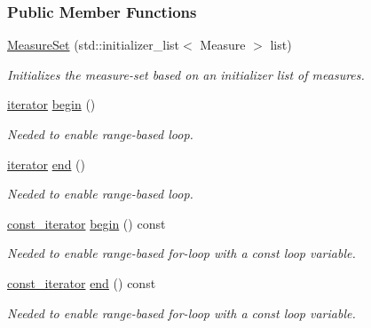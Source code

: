 \subsubsection*{Public Member Functions}
\begin{DoxyCompactItemize}
\item 
\hyperlink{structslb_1_1core_1_1sb_1_1MeasureSet_a0b03f75db584bf843a44fce20b9fd5aa}{Measure\+Set} (std\+::initializer\+\_\+list$<$ Measure $>$ list)\hypertarget{structslb_1_1core_1_1sb_1_1MeasureSet_a0b03f75db584bf843a44fce20b9fd5aa}{}\label{structslb_1_1core_1_1sb_1_1MeasureSet_a0b03f75db584bf843a44fce20b9fd5aa}

\begin{DoxyCompactList}\small\item\em Initializes the measure-\/set based on an initializer list of measures. \end{DoxyCompactList}\item 
\hyperlink{structslb_1_1core_1_1sb_1_1MeasureSet_a7e1ad3e450df31415c6282ae4ccc325f}{iterator} \hyperlink{structslb_1_1core_1_1sb_1_1MeasureSet_a2c3fc8ebeebaef3aaca79fae4df57faa}{begin} ()
\begin{DoxyCompactList}\small\item\em Needed to enable range-\/based loop. \end{DoxyCompactList}\item 
\hyperlink{structslb_1_1core_1_1sb_1_1MeasureSet_a7e1ad3e450df31415c6282ae4ccc325f}{iterator} \hyperlink{structslb_1_1core_1_1sb_1_1MeasureSet_afc9e9f8546f2ce2c2348239f593a55d3}{end} ()
\begin{DoxyCompactList}\small\item\em Needed to enable range-\/based loop. \end{DoxyCompactList}\item 
\hyperlink{structslb_1_1core_1_1sb_1_1MeasureSet_ab17d3dd6131a9604c958cd059a661db0}{const\+\_\+iterator} \hyperlink{structslb_1_1core_1_1sb_1_1MeasureSet_a68179ba28fc787c1e6361c58ddc6820b}{begin} () const 
\begin{DoxyCompactList}\small\item\em Needed to enable range-\/based for-\/loop with a const loop variable. \end{DoxyCompactList}\item 
\hyperlink{structslb_1_1core_1_1sb_1_1MeasureSet_ab17d3dd6131a9604c958cd059a661db0}{const\+\_\+iterator} \hyperlink{structslb_1_1core_1_1sb_1_1MeasureSet_a3280110d1db3127388e09a1680c16592}{end} () const 
\begin{DoxyCompactList}\small\item\em Needed to enable range-\/based for-\/loop with a const loop variable. \end{DoxyCompactList}\item 

\end{DoxyCompactItemize}
